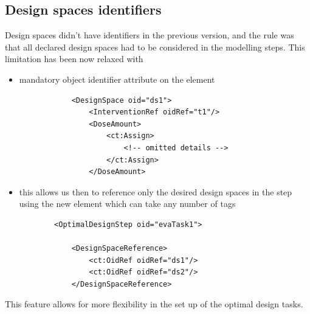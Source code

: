 \subsection{Design spaces identifiers}
\label{subsec:designSpaceId}
Design spaces didn't have identifiers in the previous version, and the 
rule was that all declared design spaces had to be considered in the modelling
steps. This limitation has been now relaxed with
\begin{itemize}
\item 
mandatory object identifier attribute  on the  element 
\lstset{language=XML}
\begin{lstlisting}
            <DesignSpace oid="ds1">
                <InterventionRef oidRef="t1"/>
                <DoseAmount>
                    <ct:Assign>
                        <!-- omitted details -->
                    </ct:Assign>
                </DoseAmount>
\end{lstlisting}
\item
this  allows us then to reference only the desired design spaces in the 
 step using the new  
element which can take any number of  tags
\lstset{language=XML}
\begin{lstlisting}
        <OptimalDesignStep oid="evaTask1">
            
            <DesignSpaceReference>
                <ct:OidRef oidRef="ds1"/>
                <ct:OidRef oidRef="ds2"/>
            </DesignSpaceReference>
\end{lstlisting}
\end{itemize}

This feature allows for more flexibility in the set up of the optimal design 
tasks.


